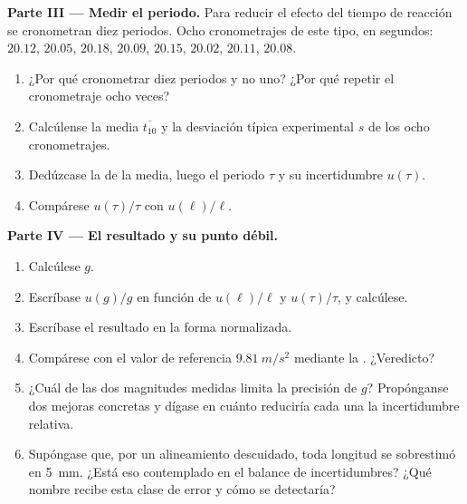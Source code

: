 \begin{problem}
\medskip
\noindent\textbf{Parte III --- Medir el periodo.}
Para reducir el efecto del tiempo de reacción se cronometran diez
periodos. Ocho cronometrajes de este tipo, en segundos: $20.12$, $20.05$,
$20.18$, $20.09$, $20.15$, $20.02$, $20.11$, $20.08$.
\begin{enumerate}[resume]
  \item ¿Por qué cronometrar diez periodos y no uno? ¿Por qué repetir el
        cronometraje ocho veces?
  \item Calcúlense la media $\overline{t_{10}}$ y la desviación típica
        experimental $s$ de los ocho cronometrajes.
  \item Dedúzcase la  de la media, luego el periodo
        $\tau$ y su incertidumbre $u(\tau)$.
  \item Compárese $u(\tau)/\tau$ con $u(\ell)/\ell$.
\end{enumerate}

\medskip
\noindent\textbf{Parte IV --- El resultado y su punto débil.}
\begin{enumerate}[resume]
  \item Calcúlese $g$.
  \item Escríbase $u(g)/g$ en función de $u(\ell)/\ell$ y $u(\tau)/\tau$,
        y calcúlese.
  \item Escríbase el resultado en la forma normalizada.
  \item Compárese con el valor de referencia $\qty{9.81}{m/s^2}$ mediante
        la . ¿Veredicto?
  \item ¿Cuál de las dos magnitudes medidas limita la precisión de $g$?
        Propónganse dos mejoras concretas y dígase en cuánto reduciría
        cada una la incertidumbre relativa.
  \item Supóngase que, por un alineamiento descuidado, toda longitud se
        sobrestimó en \qty{5}{mm}. ¿Está eso contemplado en el balance de
        incertidumbres? ¿Qué nombre recibe esta clase de error y cómo se
        detectaría?
\end{enumerate}


\end{problem}
